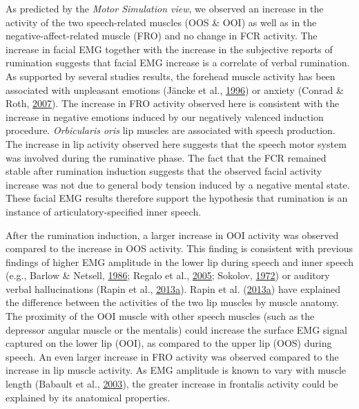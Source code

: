 \documentclass[a4paper,12pt,twoside,onecolumn,openright,final,oldfontcommands]{memoir}
\begin{document}
As predicted by the \emph{Motor Simulation view}, we observed an increase in the activity of the two speech-related muscles (OOS \& OOI) as well as in the negative-affect-related muscle (FRO) and no change in FCR activity. The increase in facial EMG together with the increase in the subjective reports of rumination suggests that facial EMG increase is a correlate of verbal rumination. As supported by several studies results, the forehead muscle activity has been associated with unpleasant emotions (Jäncke et al., \protect\hyperlink{ref-Jancke1996}{1996}) or anxiety (Conrad \& Roth, \protect\hyperlink{ref-conrad_muscle_2007}{2007}). The increase in FRO activity observed here is consistent with the increase in negative emotions induced by our negatively valenced induction procedure. \emph{Orbicularis oris} lip muscles are associated with speech production. The increase in lip activity observed here suggests that the speech motor system was involved during the ruminative phase. The fact that the FCR remained stable after rumination induction suggests that the observed facial activity increase was not due to general body tension induced by a negative mental state. These facial EMG results therefore support the hypothesis that rumination is an instance of articulatory-specified inner speech.

After the rumination induction, a larger increase in OOI activity was observed compared to the increase in OOS activity. This finding is consistent with previous findings of higher EMG amplitude in the lower lip during speech and inner speech (e.g., Barlow \& Netsell, \protect\hyperlink{ref-barlow_differential_1986}{1986}; Regalo et al., \protect\hyperlink{ref-regalo_electromyographic_2005}{2005}; Sokolov, \protect\hyperlink{ref-sokolov_inner_1972}{1972}) or auditory verbal hallucinations (Rapin et al., \protect\hyperlink{ref-rapin_emg_2013}{2013}\protect\hyperlink{ref-rapin_emg_2013}{a}). Rapin et al. (\protect\hyperlink{ref-rapin_emg_2013}{2013}\protect\hyperlink{ref-rapin_emg_2013}{a}) have explained the difference between the activities of the two lip muscles by muscle anatomy. The proximity of the OOI muscle with other speech muscles (such as the depressor angular muscle or the mentalis) could increase the surface EMG signal captured on the lower lip (OOI), as compared to the upper lip (OOS) during speech. An even larger increase in FRO activity was observed compared to the increase in lip muscle activity. As EMG amplitude is known to vary with muscle length (Babault et al., \protect\hyperlink{ref-babault_effect_2003}{2003}), the greater increase in frontalis activity could be explained by its anatomical properties.
\end{document}
